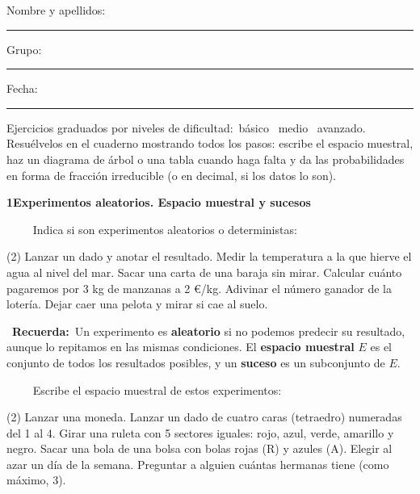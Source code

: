 \documentclass[11pt,a4paper]{article}
\newcommand{\estrelles}[1]{{\color{accent}\ifcase#1\or\faStar\faStar[regular]\faStar[regular]\or\faStar\faStar\faStar[regular]\or\faStar\faStar\faStar\fi}}
\newcounter{exer}
\newcommand{\ex}[1]{\par\needspace{4\baselineskip}\medskip\stepcounter{exer}\noindent{\color{navy}\bfseries\theexer.}\ \ {\small\estrelles{#1}}\ \ }
\newcommand{\seccio}[2]{\par\needspace{10\baselineskip}\bigskip
  \begin{tcolorbox}[colback=navy,colframe=navy,coltext=white,arc=2mm,boxrule=0pt,left=3mm,right=3mm,top=1.2mm,bottom=1.2mm]
  {\large\bfseries #1\quad #2}
  \end{tcolorbox}\vspace{-2pt}}
\newcommand{\recorda}[1]{\par\smallskip\begin{tcolorbox}[colback=accent!7,colframe=accent!55,arc=2mm,boxrule=0.5pt,left=2.5mm,right=2.5mm,top=1mm,bottom=1mm]\small{\color{accent}\faLightbulb[regular]}\ \textbf{Recuerda:}\ #1\end{tcolorbox}}
\begin{document}
\thispagestyle{primera}

\vspace{10pt}
Nombre y apellidos: \rule{6.6cm}{0.4pt}\hfill Grupo: \rule{1.6cm}{0.4pt}\hfill Fecha: \rule{2.2cm}{0.4pt}
\vspace{8pt}

\begin{tcolorbox}[colback=soft,colframe=soft,arc=2mm,left=3mm,right=3mm,top=1.5mm,bottom=1.5mm]
\small Ejercicios graduados por niveles de dificultad:\quad \estrelles{1}\ básico \qquad \estrelles{2}\ medio \qquad \estrelles{3}\ avanzado.\\[2pt] Resuélvelos en el cuaderno mostrando todos los pasos: escribe el espacio muestral, haz un diagrama de árbol o una tabla cuando haga falta y da las probabilidades en forma de fracción irreducible (o en decimal, si los datos lo son).
\end{tcolorbox}

\seccio{1}{Experimentos aleatorios. Espacio muestral y sucesos}

\ex{1} Indica si son experimentos aleatorios o deterministas:\begin{tasks}(2)
  \task Lanzar un dado y anotar el resultado.
  \task Medir la temperatura a la que hierve el agua al nivel del mar.
  \task Sacar una carta de una baraja sin mirar.
  \task Calcular cuánto pagaremos por 3 kg de manzanas a 2 €/kg.
  \task Adivinar el número ganador de la lotería.
  \task Dejar caer una pelota y mirar si cae al suelo.
\end{tasks}\recorda{Un experimento es \textbf{aleatorio} si no podemos predecir su resultado, aunque lo repitamos en las mismas condiciones. El \textbf{espacio muestral} $E$ es el conjunto de todos los resultados posibles, y un \textbf{suceso} es un subconjunto de $E$.}

\ex{1} Escribe el espacio muestral de estos experimentos:\begin{tasks}(2)
  \task Lanzar una moneda.
  \task Lanzar un dado de cuatro caras (tetraedro) numeradas del 1 al 4.
  \task Girar una ruleta con 5 sectores iguales: rojo, azul, verde, amarillo y negro.
  \task Sacar una bola de una bolsa con bolas rojas (R) y azules (A).
  \task Elegir al azar un día de la semana.
  \task Preguntar a alguien cuántas hermanas tiene (como máximo, 3).
\end{tasks}
\end{document}
